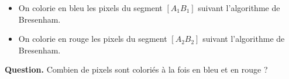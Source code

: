 \documentclass[class=report,crop=false, 12pt]{standalone}
\begin{document}
\begin{enigme}[Pixels]

\sauteligne

\begin{itemize}
  \item On colorie en bleu les pixels du segment $[A_1B_1]$ suivant l'algorithme de Bresenham.
  \item On colorie en rouge les pixels du segment $[A_2B_2]$ suivant l'algorithme de Bresenham.
\end{itemize}


 
\bigskip

\textbf{Question.} Combien de pixels sont coloriés à la fois en bleu et en rouge ?

%
%

\end{enigme}
\end{document}

